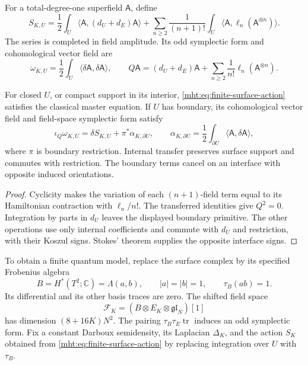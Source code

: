 For a total-degree-one superfield $\mathsf A$, define
\begin{equation}\label{mht:eq:finite-surface-action}
 S_{K,U}=\frac12\int_U\langle\mathsf A,(d_U+d_E)\mathsf A\rangle
     +\sum_{n\ge2}\frac1{(n+1)!}
          \int_U\langle\mathsf A,\ell_n(\mathsf A^{\otimes n})\rangle.
\end{equation}
The series is completed in field amplitude. Its odd symplectic form
and cohomological vector field are
\[
 \omega_{K,U}=\frac12\int_U\langle\delta\mathsf A,\delta\mathsf A\rangle,
 \qquad
 Q\mathsf A=(d_U+d_E)\mathsf A
       +\sum_{n\ge2}\frac1{n!}\ell_n(\mathsf A^{\otimes n}).
\]

\begin{proposition}\label{mht:prop:finite-surface-boundary}
For closed $U$, or compact support in its interior,
\eqref{mht:eq:finite-surface-action} satisfies the classical master
equation. If $U$ has boundary, its cohomological vector field and
field-space symplectic form satisfy
\[
 \iota_Q\omega_{K,U}=\delta S_{K,U}+\pi^*\alpha_{K,\partial U},
 \qquad
 \alpha_{K,\partial U}
      =\frac12\int_{\partial U}\langle\mathsf A,\delta\mathsf A\rangle,
\]
where $\pi$ is boundary restriction. Internal transfer preserves
surface support and commutes with restriction. The boundary terms
cancel on an interface with opposite induced orientations.
\end{proposition}

\begin{proof}
Cyclicity makes the variation of each $(n+1)$-field term equal to
its Hamiltonian contraction with $\ell_n/n!$. The transferred
identities give $Q^2=0$. Integration by parts in $d_U$ leaves the
displayed boundary primitive. The other operations use only internal
coefficients and commute with $d_U$ and restriction, with their
Koszul signs. Stokes' theorem supplies the opposite interface signs.
\end{proof}

To obtain a finite quantum model, replace the surface complex by
its specified Frobenius algebra
\[
 B=H^*(T^2;\mathbb C)=\Lambda(a,b),\qquad
 |a|=|b|=1,\qquad \tau_B(ab)=1.
\]
Its differential and its other basis traces are zero. The shifted
field space
\[
 \mathcal F_K=(B\otimes E_K\otimes\mathfrak{gl}_N)[1]
\]
has dimension $(8+16K)N^2$. The pairing
$\tau_B\tau_E\operatorname{tr}$ induces an odd symplectic form.
Fix a constant Darboux semidensity, its Laplacian $\Delta_K$, and
the action $S_K$ obtained from \eqref{mht:eq:finite-surface-action}
by replacing integration over $U$ with $\tau_B$.

